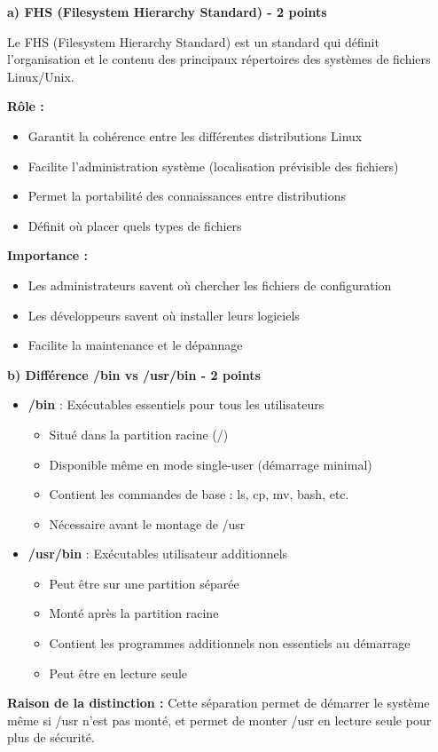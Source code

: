 \documentclass[12pt,a4paper]{article}
\begin{document}
\begin{answerbox}
\textbf{a) FHS (Filesystem Hierarchy Standard) - 2 points}

Le FHS (Filesystem Hierarchy Standard) est un standard qui définit l'organisation et le contenu des principaux répertoires des systèmes de fichiers Linux/Unix.

\textbf{Rôle :}
\begin{itemize}
    \item Garantit la cohérence entre les différentes distributions Linux
    \item Facilite l'administration système (localisation prévisible des fichiers)
    \item Permet la portabilité des connaissances entre distributions
    \item Définit où placer quels types de fichiers
\end{itemize}

\textbf{Importance :}
\begin{itemize}
    \item Les administrateurs savent où chercher les fichiers de configuration
    \item Les développeurs savent où installer leurs logiciels
    \item Facilite la maintenance et le dépannage
\end{itemize}

\textbf{b) Différence /bin vs /usr/bin - 2 points}

\begin{itemize}
    \item \textbf{/bin} : Exécutables essentiels pour tous les utilisateurs
    \begin{itemize}
        \item Situé dans la partition racine (/)
        \item Disponible même en mode single-user (démarrage minimal)
        \item Contient les commandes de base : ls, cp, mv, bash, etc.
        \item Nécessaire avant le montage de /usr
    \end{itemize}
    \item \textbf{/usr/bin} : Exécutables utilisateur additionnels
    \begin{itemize}
        \item Peut être sur une partition séparée
        \item Monté après la partition racine
        \item Contient les programmes additionnels non essentiels au démarrage
        \item Peut être en lecture seule
    \end{itemize}
\end{itemize}

\textbf{Raison de la distinction :} Cette séparation permet de démarrer le système même si /usr n'est pas monté, et permet de monter /usr en lecture seule pour plus de sécurité.
\end{answerbox}
\end{document}
